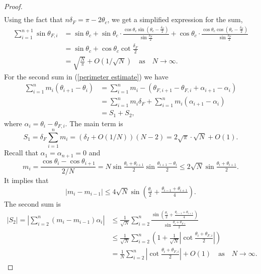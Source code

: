 \documentclass[10pt,a4paper]{amsart}
\begin{document}
\begin{proof}
\begin{align*}
\end{align*}
Using the fact that $n\delta_F=\pi-2\theta_c$, we get a simplified expression for the sum,
\begin{align*}
      \sum\limits_{i=1}^{n+1}\sin\theta_{F,i}&=\sin\theta_c+\sin\theta_c\cdot \frac{\cos\theta_c\sin(\theta_c-\frac{\delta_F}{2})}{\sin\frac{\delta_F}{2}}+\cos\theta_c\cdot \frac{\cos\theta_c\cos(\theta_c-\frac{\delta_F}{2})}{\sin\frac{\delta_F}{2}}
      \\ &=\sin\theta_c+\cos\theta_c\cot\frac{\delta_F}{2}
      \\ &=\sqrt{\frac{N}{\pi}}+O(1/\sqrt{N})\quad \text{as}\quad N\rightarrow\infty.
\end{align*}
For the second sum in (\ref{perimeter estimate}) we have
\begin{align*}
    \sum\limits_{i=1}^nm_i(\theta_{i+1}-\theta_i)&=\sum_{i=1}^nm_i-(\theta_{F,i+1}-\theta_{F,i}+\alpha_{i+1}-\alpha_i)
    \\&=\sum\limits_{i=1}^nm_i\delta_F+\sum\limits_{i=1}^nm_i(\alpha_{i+1}-\alpha_i)
    \\&=S_{1}+S_2,
\end{align*}
where $\alpha_i=\theta_i-\theta_{F,i}$. The main term is
$$S_1=\delta_F\sum\limits_{i=1}^nm_i=\left(\delta_I+O(1/N)\right)(N-2)=2\sqrt{\pi}\cdot\sqrt{N}+O(1).$$
Recall that $\alpha_1=\alpha_{n+1}=0$ and
\begin{equation*}
    m_{i}=\frac{\cos\theta_i-\cos\theta_{i+1}}{2/N}=N\sin\tfrac{\theta_i+\theta_{i+1}}{2}\sin\tfrac{\theta_{i+1}-\theta_{i}}{2}\leq2\sqrt N\sin \tfrac{\theta_i+\theta_{i+1}}{2}.
\end{equation*}
It implies that 
\begin{equation*}
    |m_{i}-m_{i-1}|\leq 4\sqrt{N}\sin\left(\tfrac{\theta_i}{2}+\tfrac{\theta_{i-1}+\theta_{i+1}}{4}\right).
\end{equation*}
The second sum is
\begin{align*}
    |S_2|=\left|\sum_{i=2}^n(m_i-m_{i-1})\alpha_i\right|&\leq\frac{1}{\sqrt{N}} \sum\limits_{i=2}^n\frac{\sin\left(\tfrac{\theta_i}{2}+\tfrac{\theta_{i-1}+\theta_{i+1}}{4}\right)}{\sin\tfrac{\theta_{i}+\theta_{F,i}}{2}}
    \\&\leq \frac{1}{\sqrt{N}} \sum\limits_{i=2}^n\left(1+\tfrac{1}{\sqrt{N}}\left|\cot\tfrac{\theta_{i}+\theta_{F,i}}{2}\right|\right)
    \\ &=\frac{1}{N}\sum\limits_{i=2}^n\left|\cot\tfrac{\theta_{i}+\theta_{F,i}}{2}\right|+O(1)\quad \text{as}\quad N\rightarrow\infty.
\end{align*}

\end{proof}
\end{document}
